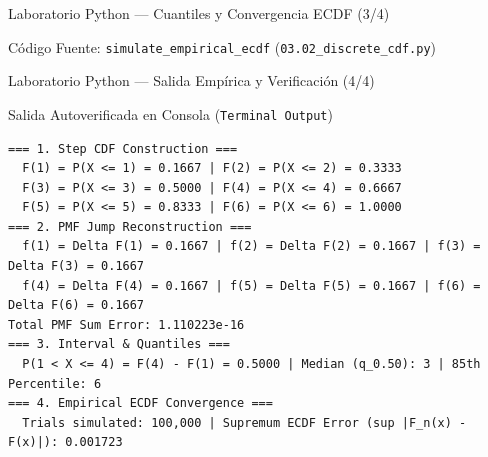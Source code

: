 \documentclass[10pt, aspectratio=169]{beamer}
\begin{document}
\begin{frame}[fragile]{Laboratorio Python — Cuantiles y Convergencia ECDF (3/4)}
  \begin{block}{Código Fuente: \texttt{simulate\_empirical\_ecdf} (\texttt{03.02\_discrete\_cdf.py})}
    \fontsize{6pt}{7pt}\selectfont
    
  \end{block}
\end{frame}

\begin{frame}[fragile]{Laboratorio Python — Salida Empírica y Verificación (4/4)}
  \begin{block}{Salida Autoverificada en Consola (\texttt{Terminal Output})}
    \fontsize{6.5pt}{7.5pt}\selectfont
\begin{verbatim}
=== 1. Step CDF Construction ===
  F(1) = P(X <= 1) = 0.1667 | F(2) = P(X <= 2) = 0.3333
  F(3) = P(X <= 3) = 0.5000 | F(4) = P(X <= 4) = 0.6667
  F(5) = P(X <= 5) = 0.8333 | F(6) = P(X <= 6) = 1.0000
=== 2. PMF Jump Reconstruction ===
  f(1) = Delta F(1) = 0.1667 | f(2) = Delta F(2) = 0.1667 | f(3) = Delta F(3) = 0.1667
  f(4) = Delta F(4) = 0.1667 | f(5) = Delta F(5) = 0.1667 | f(6) = Delta F(6) = 0.1667
Total PMF Sum Error: 1.110223e-16
=== 3. Interval & Quantiles ===
  P(1 < X <= 4) = F(4) - F(1) = 0.5000 | Median (q_0.50): 3 | 85th Percentile: 6
=== 4. Empirical ECDF Convergence ===
  Trials simulated: 100,000 | Supremum ECDF Error (sup |F_n(x) - F(x)|): 0.001723
\end{verbatim}
  \end{block}
\end{frame}

\end{document}
